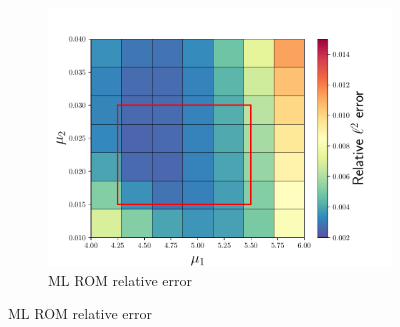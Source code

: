 \documentclass[3p,computermodern,10pt]{elsarticle}
\begin{document}
\begin{figure}
\begin{center}
\begin{subfigure}[t]{0.32\textwidth}
\includegraphics[trim={0cm 0cm 0cm 0cm},clip,width=1.0\linewidth]{code/burgers/synapse_models/elu/results/uml_error_vs_param.pdf} 
\caption{ML ROM relative error}
\end{subfigure}
\label{fig:rom_metrics_swe_updatefreq}
\end{center}
\end{figure}



\end{document}
